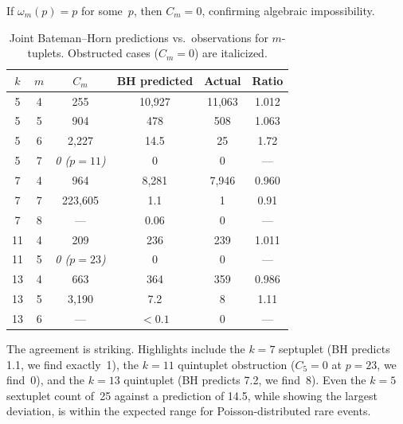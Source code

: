 \documentclass[11pt,a4paper]{article}
\begin{document}
If $\omega_m(p) = p$ for some~$p$, then $C_m = 0$, confirming algebraic impossibility.

\begin{table}[ht]
\centering
\caption{Joint Bateman--Horn predictions vs.\ observations for $m$-tuplets. Obstructed cases ($C_m = 0$) are italicized.}\label{tab:joint}
\smallskip
\begin{tabular}{cccccc}
\toprule
$k$ & $m$ & $C_m$ & BH predicted & Actual & Ratio \\
\midrule
5  & 4 & 255                   & 10{,}927 & 11{,}063 & 1.012 \\
5  & 5 & 904                   & 478      & 508      & 1.063 \\
5  & 6 & 2{,}227               & 14.5     & 25       & 1.72 \\
5  & 7 & \textit{0 ($p{=}11$)} & 0        & 0        & --- \\
7  & 4 & 964                   & 8{,}281  & 7{,}946  & 0.960 \\
7  & 7 & 223{,}605             & 1.1      & 1        & 0.91 \\
7  & 8 & ---                   & 0.06     & 0        & --- \\
11 & 4 & 209                   & 236      & 239      & 1.011 \\
11 & 5 & \textit{0 ($p{=}23$)} & 0        & 0        & --- \\
13 & 4 & 663                   & 364      & 359      & 0.986 \\
13 & 5 & 3{,}190               & 7.2      & 8        & 1.11 \\
13 & 6 & ---                   & $< 0.1$  & 0        & --- \\
\bottomrule
\end{tabular}
\end{table}

The agreement is striking. Highlights include the $k = 7$ septuplet (BH predicts 1.1, we find exactly~1), the $k = 11$ quintuplet obstruction ($C_5 = 0$ at $p = 23$, we find~0), and the $k = 13$ quintuplet (BH predicts 7.2, we find~8). Even the $k = 5$ sextuplet count of~25 against a prediction of 14.5, while showing the largest deviation, is within the expected range for Poisson-distributed rare events.
\end{document}
